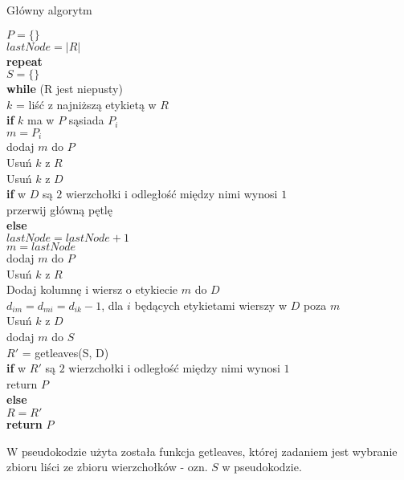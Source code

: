 \documentclass[a4paper,12p]{article}
\newcommand\tab[1][1cm]{\hspace*{#1}}
\begin{document}
\begin{algorithm}
		\caption{Główny algorytm}
		\label{algo}
		$P = \{ \}$ \\
		$lastNode = |R|$ \\
		\textbf{repeat} \\
		\tab  $S = \{ \}$ \\
		\tab \textbf{while} (R jest niepusty) \\
		\tab \tab $k$ = liść z najniższą etykietą w $R$ \\
		\tab \tab \textbf{if} $k$ ma w $P$ sąsiada $P_i$ \\
		\tab \tab \tab $m = P_i$ \\
		\tab \tab \tab dodaj $m$ do $P$ \\
		\tab \tab \tab Usuń $k$ z $R$ \\
		\tab \tab \tab Usuń $k$ z $D$ \\
		\tab \tab \tab \textbf{if} w $D$ są $2$ wierzchołki i odległość między nimi wynosi $1$ \\
		\tab \tab \tab \tab przerwij główną pętlę \\
		\tab \tab \textbf{else} \\
		\tab \tab \tab $lastNode = lastNode + 1$ \\
		\tab \tab \tab $m = lastNode$ \\
		\tab \tab \tab dodaj $m$ do $P$ \\
		\tab \tab \tab Usuń $k$ z $R$ \\
		\tab \tab \tab Dodaj kolumnę i wiersz o etykiecie $m$ do $D$ \\
		\tab \tab \tab $d_{im} = d_{mi} = d_{ik} - 1$, dla $i$ będących etykietami wierszy w $D$ poza $m$ \\
		\tab \tab \tab Usuń $k$ z $D$ \\
		\tab \tab \tab dodaj $m$ do $S$ \\
		\tab  $R'$ = getleaves(S, D) \\
		\tab \textbf{if} w $R'$ są $2$ wierzchołki i odległość między nimi wynosi $1$ \\
		\tab \tab return $P$ \\
		\tab \textbf{else} \\
		\tab \tab $R = R'$ \\
		\textbf{return} $P$ \\
\end{algorithm}

\newpage

W pseudokodzie użyta została funkcja getleaves, której zadaniem jest wybranie zbioru liści ze zbioru wierzchołków - ozn. $S$ w pseudokodzie.
\end{document}

